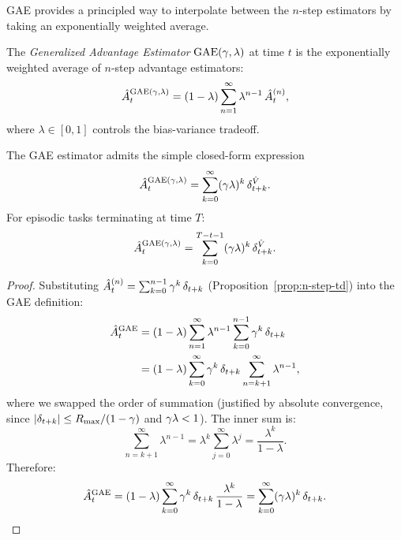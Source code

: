 \documentclass[11pt,a4paper]{article}
\begin{document}
GAE provides a principled way to interpolate between the $n$-step
estimators by taking an exponentially weighted average.

\begin{definition}
\label{def:gae}
The \emph{Generalized Advantage Estimator} $\operatorname{GAE}(\gamma,
\lambda)$ at time $t$ is the exponentially weighted average of $n$-step
advantage estimators:
\[
  \hat{A}_t^{\mathrm{GAE}(\gamma,\lambda)}
  = (1 - \lambda) \sum_{n=1}^{\infty} \lambda^{n-1}\, \hat{A}_t^{(n)},
\]
where $\lambda \in [0,1]$ controls the bias-variance tradeoff.
\end{definition}

\begin{theorem}
\label{thm:gae-td}
The GAE estimator admits the simple closed-form expression
\[
  \hat{A}_t^{\mathrm{GAE}(\gamma,\lambda)}
  = \sum_{k=0}^{\infty} (\gamma\lambda)^k\, \delta_{t+k}^{\hat{V}}.
\]
For episodic tasks terminating at time $T$:
\[
  \hat{A}_t^{\mathrm{GAE}(\gamma,\lambda)}
  = \sum_{k=0}^{T-t-1} (\gamma\lambda)^k\, \delta_{t+k}^{\hat{V}}.
\]
\end{theorem}

\begin{proof}
Substituting $\hat{A}_t^{(n)} = \sum_{k=0}^{n-1} \gamma^k\,
\delta_{t+k}$ (Proposition~\ref{prop:n-step-td}) into the GAE definition:
\begin{align*}
  \hat{A}_t^{\mathrm{GAE}}
  &= (1-\lambda) \sum_{n=1}^{\infty} \lambda^{n-1}
    \sum_{k=0}^{n-1} \gamma^k\, \delta_{t+k} \\
  &= (1-\lambda) \sum_{k=0}^{\infty} \gamma^k\, \delta_{t+k}
    \sum_{n=k+1}^{\infty} \lambda^{n-1},
\end{align*}
where we swapped the order of summation (justified by absolute
convergence, since $|\delta_{t+k}| \leq R_{\max}/(1-\gamma)$ and
$\gamma\lambda < 1$). The inner sum is:
\[
  \sum_{n=k+1}^{\infty} \lambda^{n-1}
  = \lambda^k \sum_{j=0}^{\infty} \lambda^j
  = \frac{\lambda^k}{1 - \lambda}.
\]
Therefore:
\[
  \hat{A}_t^{\mathrm{GAE}}
  = (1-\lambda) \sum_{k=0}^{\infty} \gamma^k\, \delta_{t+k}\,
  \frac{\lambda^k}{1-\lambda}
  = \sum_{k=0}^{\infty} (\gamma\lambda)^k\, \delta_{t+k}. \qedhere
\]
\end{proof}
\end{document}
